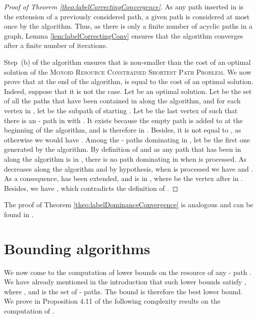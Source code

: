 \documentclass[11pt]{amsart}
\theoremstyle{plain}
\theoremstyle{remark}
\newcommand{\MRCSP}{\textsc{Monoid Resource Constrained Shortest Path Problem}\xspace}
\begin{document}
\begin{proof}[Proof of Theorem \ref{theo:labelCorrectingConvergence}]
As any path inserted in  is the extension of a previously considered path, a given path is considered at most once by the algorithm. Thus, as there is only a finite number of acyclic paths in a graph, Lemma \ref{lem:labelCorrectingConv} ensures that the algorithm converges after a finite number of iterations.


Step~(b) of the algorithm ensures that  is non-smaller than the cost of an optimal solution of the \MRCSP. We now prove that at the end of the algorithm,  is equal to the cost of an optimal solution. Indeed, suppose that it is not the case. Let  be an optimal solution. Let  be the set of all the paths that have been contained in  along the algorithm, and for each vertex  in , let  be the subpath of  starting  . Let  be the last vertex of  such that there is an - path  in  with . It exists because the empty path  is added to  at the beginning of the algorithm, and is therefore in . Besides, it is not equal to , as otherwise we would have . Among the - paths dominating  in , let  be the first one generated by the algorithm. 
By definition of  and as any path that has been in  along the algorithm is in , there is no path dominating  in  when  is processed. 
As  decreases along the algorithm and by hypothesis, when  is processed we have  and . As a consequence,  has been extended, and  is in , where  be the vertex after  in . Besides, we have , which contradicts the definition of .
\end{proof}

The proof of Theorem \ref{theo:labelDominanceConvergence} is analogous and can be found in \cite{parmentier2016thesis}.


























\section{Bounding algorithms} \label{sec:bounding_algorithms}

We now come to the computation of lower bounds  on the resource of any - path . We have already mentioned in the introduction that such lower bounds  satisfy , where , and  is the set of - paths. The bound  is therefore the best lower bound. We prove in Proposition 4.11 of \cite{parmentier2016thesis} the following complexity results on the computation of .
\end{document}
